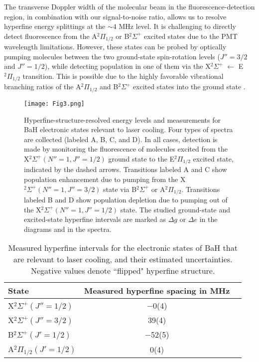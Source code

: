 \documentclass[amsmath,amssymb,aps,twocolumn,longbibliography,notitlepage]{revtex4-1}
\begin{document}
The transverse Doppler width of the molecular beam in the fluorescence-detection region, in combination with our signal-to-noise ratio, allows us to resolve hyperfine energy splittings at the $\sim4$ MHz level.  It is challenging to directly detect fluorescence from the A$^2\Pi_{1/2}$ or B$^2\Sigma^+$ excited states due to the PMT wavelength limitations.  However, these states can be probed by optically pumping molecules between the two ground-state spin-rotation levels ($J''=3/2$ and $J''=1/2$), while detecting population in one of them via the X$^2\Sigma^+$ $\leftarrow$ E$^2\Pi_{1/2}$ transition.  This is possible due to the highly favorable vibrational branching ratios of the A$^2\Pi_{1/2}$ and B$^2\Sigma^+$ excited states into the ground state \cite{ZelevinskyTaralloPRA16_BaH,LanePRA15_HFromBaH}.

\begin{figure}[h]
\texttt{[image: Fig3.png]}
\caption{Hyperfine-structure-resolved energy levels and measurements for BaH electronic states relevant to laser cooling.  Four types of spectra are collected (labeled A, B, C, and D).  In all cases, detection is made by monitoring the fluorescence of molecules excited from the X$^2\Sigma^+ (N''=1, J''=1/2)$ ground state to the E$^2\Pi_{1/2}$ excited state, indicated by the dashed arrows.  Transitions labeled A and C show population enhancement due to pumping from the X$^2\Sigma^+ (N''=1, J''=3/2)$ state via B$^2\Sigma^+$ or A$^2\Pi_{1/2}$.  Transitions labeled B and D show population depletion due to pumping out of the X$^2\Sigma^+ (N''=1, J''=1/2)$ state.  The studied ground-state and excited-state hyperfine intervals are marked as $\Delta g$ or $\Delta e$ in the diagrams and in the spectra.}
\label{fig:hfine}
\centering
\end{figure}
\begingroup
\begin{table}[h]%
\caption{\label{table:hfine} Measured hyperfine intervals for the electronic states of BaH that are relevant to laser cooling, and their estimated uncertainties.  Negative values denote ``flipped" hyperfine structure.}
\begin{ruledtabular}
\begin{tabular}{l c c}
State & Measured hyperfine spacing in MHz\\
\hline
X$^2\Sigma^+(J''=1/2)$ & $-$0(4) \\
X$^2\Sigma^+(J''=3/2)$ & 39(4) \\
\hline
B$^2\Sigma^+(J'=1/2)$ & $-$52(5) \\
\hline
A$^2\Pi_{1/2}(J'=1/2)$ & 0(4) \\
\end{tabular}
\end{ruledtabular}
\end{table}
\end{document}
